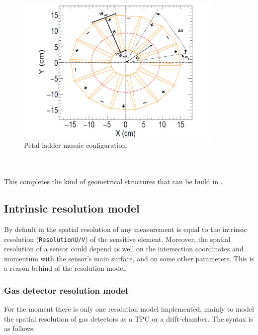 \begin{figure}
  \centering
  \includegraphics[width=0.9\textwidth]{figures/Petal_Mosaic.pdf}
  \caption{Petal ladder mosaic configuration.}
  \label{fig:Petal_ladder_mosaic}
\end{figure}

~\\
~\\
\noindent
This completes the kind of geometrical structures that can be build in {\guari}. 

\subsection{Intrinsic resolution model}

By default in {\guari} the spatial resolution of any measurement is equal to the intrinsic resolution ({\tt ResolutionU/V}) of the sensitive element. 
Moreover, the spatial resolution of a sensor could depend as well on the intersection coordinates and momentum with the sensor's main surface, and on 
some other parameters. This is a reason behind of the resolution model.

\subsubsection{Gas detector resolution model}
\label{subsubsec:GasDet_resolModel}

For the moment there is only one resolution model implemented, mainly to model the spatial resolution of gas detectors as a TPC or a drift-chamber. 
The syntax is as follows.

